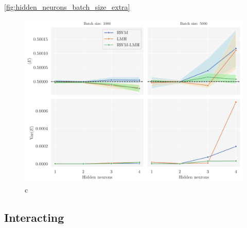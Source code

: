 \autoref{fig:hidden_neurons_batch_size_extra}

\begin{figure}[!htb]
\begin{center}\includegraphics[width=\textwidth]{latex/figures/hidden_neurons_batch_size_extra.pdf}
\end{center}
\caption{c}
\label{fig:hidden_neurons_batch_size_extra}
\end{figure}

\subsection{Interacting}\label{sec:project results}
















